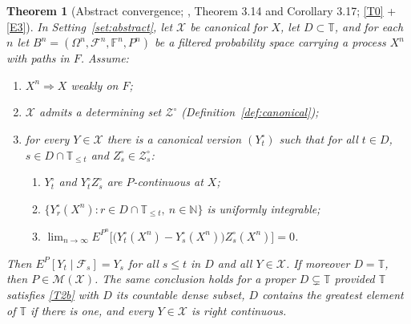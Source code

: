 \documentclass[11pt,a4paper]{article}
\theoremstyle{plain}
\newtheorem{theorem}{Theorem}[section]
\theoremstyle{definition}
\theoremstyle{remark}
\newcommand{\N}{\mathbb{N}}
\newcommand{\T}{\mathbb{T}}                     %
\newcommand{\Filt}{\mathcal{F}}
\newcommand{\XX}{\mathcal{X}}                  %
\newcommand{\ZZ}{\mathcal{Z}}                  %
\newcommand{\Msol}{\mathcal{M}}
\DeclareMathOperator*{\wto}{\Rightarrow}
\newcommand{\CPS}{\cite{CPS23}}
\begin{document}
\begin{theorem}[Abstract convergence; \CPS, Theorem 3.14 and Corollary 3.17; \eqref{T0} + \eqref{E3}]
  \label{thm:absconv}
  In Setting~\ref{set:abstract}, let $\XX$ be canonical for $X$, let
  $D \subset \T$, and for each $n$ let $B^n = (\Omega^n,\Filt^n,\mathbb{F}^n,P^n)$
  be a filtered probability space carrying a process $X^n$ with paths in $F$.
  Assume:
  \begin{enumerate}[label=(C\arabic*)]
  \item \label{it:C1} $X^n \wto X$ weakly on $F$;
  \item \label{it:C2} $\XX$ admits a determining set $\ZZ^\circ$
    (Definition~\ref{def:canonical});
  \item \label{it:C3} for every $Y \in \XX$ there is a canonical version
    $(Y^\circ_t)$ such that for all $t \in D$, $s \in D \cap \T_{\leq t}$ and
    $Z^\circ_s \in \ZZ^\circ_s$:
    \begin{enumerate}[label=(\alph*)]
    \item \label{it:C3a} $Y^\circ_t$ and $Y^\circ_t Z^\circ_s$ are $P$-continuous
      at $X$;
    \item \label{it:C3b} $\{ Y^\circ_r(X^n) : r \in D \cap \T_{\leq t},\ n \in \N \}$
      is uniformly integrable;
    \item \label{it:C3c}
      $\displaystyle \lim_{n \to \infty}
        E^{P^n}\bigl[ \bigl( Y^\circ_t(X^n) - Y^\circ_s(X^n) \bigr) Z^\circ_s(X^n) \bigr]
        = 0$.
    \end{enumerate}
  \end{enumerate}
  Then $E^P[Y_t \mid \Filt_s] = Y_s$ for all $s \leq t$ in $D$ and all
  $Y \in \XX$.  If moreover $D = \T$, then $P \in \Msol(\XX)$.  The same
  conclusion holds for a proper $D \subsetneq \T$ provided $\T$ satisfies \eqref{T2b}
  with $D$ its countable dense subset, $D$ contains the greatest element of $\T$
  if there is one, and every $Y \in \XX$ is right continuous.
\end{theorem}
\end{document}
